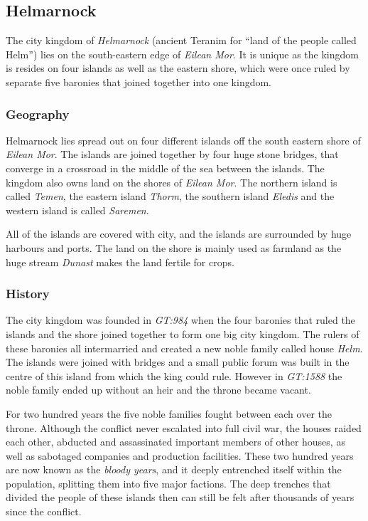 \subsection{Helmarnock}
\label{sec:Helmarnock}

The city kingdom of \emph{Helmarnock} (ancient Teranim for ``land of the
people called Helm'') lies on the south-eastern edge of \emph{Eilean Mor}. It
is unique as the kingdom is resides on four islands as well as the eastern
shore, which were once ruled by separate five baronies that joined together
into one kingdom.

\subsubsection{Geography}

Helmarnock lies spread out on four different islands off the south eastern
shore of \emph{Eilean Mor}. The islands are joined together by four huge
stone bridges, that converge in a crossroad in the middle of the sea between
the islands. The kingdom also owns land on the shores of \emph{Eilean Mor}.
The northern island is called \emph{Temen}, the eastern island \emph{Thorm},
the southern island \emph{Eledis} and the western island is called
\emph{Saremen}.

All of the islands are covered with city, and the islands are surrounded by
huge harbours and ports. The land on the shore is mainly used as farmland as
the huge stream \emph{Dunast} makes the land fertile for crops.

\subsubsection{History}

The city kingdom was founded in \emph{GT:984} when the four baronies that
ruled the islands and the shore joined together to form one big city kingdom.
The rulers of these baronies all intermarried and created a new noble family
called house \emph{Helm}. The islands were joined with bridges and a small
public forum was built in the centre of this island from which the king could
rule. However in \emph{GT:1588} the noble family ended up without an heir and
the throne became vacant.

For two hundred years the five noble families fought between each over the
throne. Although the conflict never escalated into full civil war, the houses
raided each other, abducted and assassinated important members of other
houses, as well as sabotaged companies and production facilities. These two
hundred years are now known as the \emph{bloody years}, and it deeply
entrenched itself within the population, splitting them into five major
factions. The deep trenches that divided the people of these islands then can
still be felt after thousands of years since the conflict.

